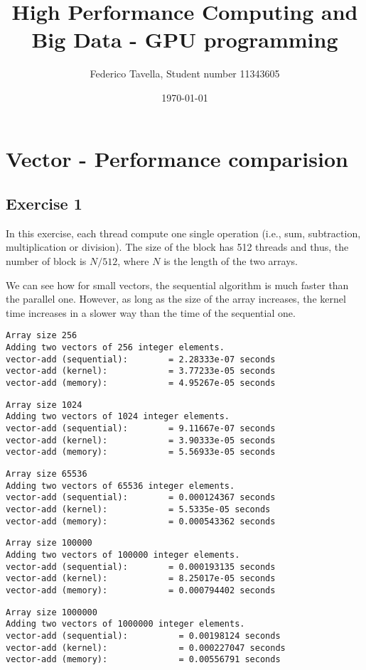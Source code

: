 \documentclass[a4paper]{article}
\title{High Performance Computing and Big Data - GPU programming}
\author{Federico Tavella, Student number 11343605}
\date{\today}
\begin{document}
\maketitle

\section{Vector - Performance comparision}

\subsection{Exercise 1}

In this exercise, each thread compute one single operation (i.e., sum, subtraction, multiplication or division). The size of the block has 512 threads and thus, the number of block is $N/512$, where $N$ is the length of the two arrays.  

We can see how for small vectors, the sequential algorithm is much faster than the parallel one. However, as long as the size of the array increases, the kernel time increases in a slower way than the time of the sequential one.

\begin{verbatim}
Array size 256
Adding two vectors of 256 integer elements.
vector-add (sequential):        = 2.28333e-07 seconds
vector-add (kernel):            = 3.77233e-05 seconds
vector-add (memory):            = 4.95267e-05 seconds
\end{verbatim}
\begin{verbatim}
Array size 1024
Adding two vectors of 1024 integer elements.
vector-add (sequential):        = 9.11667e-07 seconds
vector-add (kernel):            = 3.90333e-05 seconds
vector-add (memory):            = 5.56933e-05 seconds
\end{verbatim}
\begin{verbatim}
Array size 65536
Adding two vectors of 65536 integer elements.
vector-add (sequential):        = 0.000124367 seconds
vector-add (kernel):            = 5.5335e-05 seconds
vector-add (memory):            = 0.000543362 seconds
\end{verbatim}
\begin{verbatim}
Array size 100000
Adding two vectors of 100000 integer elements.
vector-add (sequential):        = 0.000193135 seconds
vector-add (kernel):            = 8.25017e-05 seconds
vector-add (memory):            = 0.000794402 seconds
\end{verbatim}
\begin{verbatim}
Array size 1000000
Adding two vectors of 1000000 integer elements.
vector-add (sequential): 	      = 0.00198124 seconds
vector-add (kernel): 	          = 0.000227047 seconds
vector-add (memory): 	          = 0.00556791 seconds
\end{verbatim}
\end{document}

